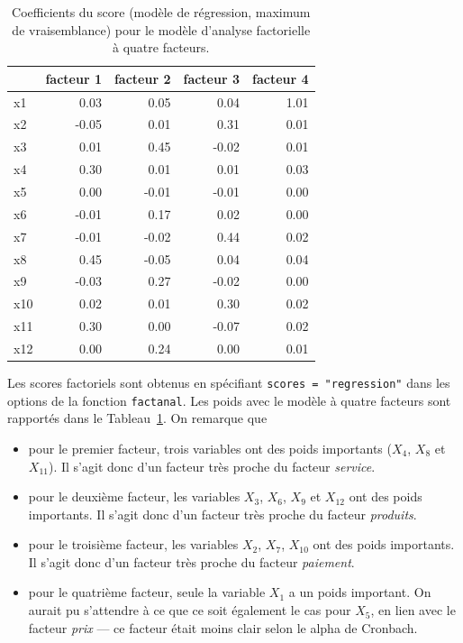 \documentclass[
  11pt,
  letterpaper,
]{scrbook}
\providecommand{\tightlist}{%
  \setlength{\itemsep}{0pt}\setlength{\parskip}{0pt}}\usepackage{longtable,booktabs,array}
\theoremstyle{definition}
\theoremstyle{remark}
\begin{document}
\hypertarget{tbl-scores}{}
\begin{table}
\caption{\label{tbl-scores}Coefficients du score (modèle de régression, maximum de vraisemblance)
pour le modèle d'analyse factorielle à quatre facteurs. }\tabularnewline

\centering
\begin{tabular}{lrrrr}
\toprule
  & facteur 1 & facteur 2 & facteur 3 & facteur 4\\
\midrule
x1 & 0.03 & 0.05 & 0.04 & 1.01\\
x2 & -0.05 & 0.01 & 0.31 & 0.01\\
x3 & 0.01 & 0.45 & -0.02 & 0.01\\
x4 & 0.30 & 0.01 & 0.01 & 0.03\\
x5 & 0.00 & -0.01 & -0.01 & 0.00\\
\addlinespace
x6 & -0.01 & 0.17 & 0.02 & 0.00\\
x7 & -0.01 & -0.02 & 0.44 & 0.02\\
x8 & 0.45 & -0.05 & 0.04 & 0.04\\
x9 & -0.03 & 0.27 & -0.02 & 0.00\\
x10 & 0.02 & 0.01 & 0.30 & 0.02\\
\addlinespace
x11 & 0.30 & 0.00 & -0.07 & 0.02\\
x12 & 0.00 & 0.24 & 0.00 & 0.01\\
\bottomrule
\end{tabular}
\end{table}

Les scores factoriels sont obtenus en spécifiant
\texttt{scores\ =\ "regression"} dans les options de la fonction
\texttt{factanal}. Les poids avec le modèle à quatre facteurs sont
rapportés dans le Tableau~\ref{tbl-scores}. On remarque que

\begin{itemize}
\tightlist
\item
  pour le premier facteur, trois variables ont des poids importants
  (\(X_4\), \(X_8\) et \(X_{11}\)). Il s'agit donc d'un facteur très
  proche du facteur \emph{service}.
\item
  pour le deuxième facteur, les variables \(X_3\), \(X_6\), \(X_9\) et
  \(X_{12}\) ont des poids importants. Il s'agit donc d'un facteur très
  proche du facteur \emph{produits}.
\item
  pour le troisième facteur, les variables \(X_2\), \(X_7\), \(X_{10}\)
  ont des poids importants. Il s'agit donc d'un facteur très proche du
  facteur \emph{paiement}.
\item
  pour le quatrième facteur, seule la variable \(X_1\) a un poids
  important. On aurait pu s'attendre à ce que ce soit également le cas
  pour \(X_5\), en lien avec le facteur \emph{prix} --- ce facteur était
  moins clair selon le alpha de Cronbach.
\end{itemize}
\end{document}
